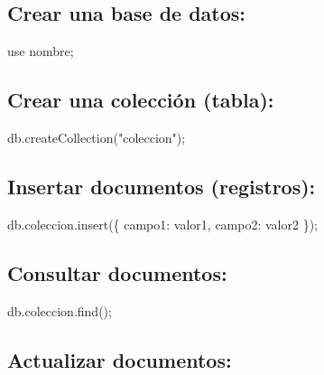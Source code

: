 \documentclass[
  a4paper,
  onepage,
  openany]{scrreprt}
\newenvironment{Shaded}{\begin{snugshade}}{\end{snugshade}}
\newcommand{\NormalTok}[1]{\textcolor[rgb]{0.00,0.23,0.31}{#1}}
\begin{document}
\hypertarget{crear-una-base-de-datos-3}{%
\subsection{Crear una base de datos:}\label{crear-una-base-de-datos-3}}

\begin{Shaded}
\begin{Highlighting}[]
\NormalTok{use nombre;}
\end{Highlighting}
\end{Shaded}

\hypertarget{crear-una-colecciuxf3n-tabla-1}{%
\subsection{Crear una colección
(tabla):}\label{crear-una-colecciuxf3n-tabla-1}}

\begin{Shaded}
\begin{Highlighting}[]
\NormalTok{db.createCollection("coleccion");}
\end{Highlighting}
\end{Shaded}

\hypertarget{insertar-documentos-registros-1}{%
\subsection{Insertar documentos
(registros):}\label{insertar-documentos-registros-1}}

\begin{Shaded}
\begin{Highlighting}[]
\NormalTok{db.coleccion.insert(\{ campo1: valor1, campo2: valor2 \});}
\end{Highlighting}
\end{Shaded}

\hypertarget{consultar-documentos-1}{%
\subsection{Consultar documentos:}\label{consultar-documentos-1}}

\begin{Shaded}
\begin{Highlighting}[]
\NormalTok{db.coleccion.find();}
\end{Highlighting}
\end{Shaded}

\hypertarget{actualizar-documentos-1}{%
\subsection{Actualizar documentos:}\label{actualizar-documentos-1}}
\end{document}
